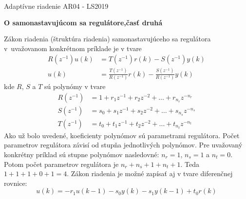 \documentclass[a4paper, 10pt, ]{article}
\def\oznacenieCasti{AR04 - LS2019}
\begin{document}
\fontsize{12pt}{22pt}\selectfont

\centerline{\textsf{Adaptívne riadenie} \hfill \textsf{\oznacenieCasti}}

\fontsize{18pt}{22pt}\selectfont





\begin{flushleft}
	\textbf{\textsf{O samonastavujúcom sa regulátore,\newline časť druhá}}
\end{flushleft}





\normalsize

\bigskip

\tableofcontents

\bigskip

\vspace{18pt}





Zákon riadenia (štruktúra riadenia) samonastavujúceho sa regulátora v~uvažovanom konkrétnom príklade je v tvare
\begin{subequations} \label{zakonRiadenia}
	\begin{align}
		R(z^{-1})u(k) & = T(z^{-1})r(k) - S(z^{-1})y(k) \\
		u(k) & = \frac{T(z^{-1})}{R(z^{-1})}r(k) - \frac{S(z^{-1})}{R(z^{-1})}y(k)
	\end{align}
\end{subequations}
kde $R$, $S$ a $T$ sú polynómy v tvare
\begin{subequations}
	\begin{align}
		R(z^{-1}) & = 1 + r_1z^{-1} + r_2z^{-2} + \ldots +  r_{n_r}z^{-n_r}\\
		S(z^{-1}) & = s_0 + s_1z^{-1} + s_2z^{-2} + \ldots +  s_{n_s}z^{-n_s} \\
		T(z^{-1}) & = t_0 + t_1z^{-1} + t_2z^{-2} + \ldots +  t_{n_t}z^{-n_t}
	\end{align}
\end{subequations}
Ako už bolo uvedené, koeficienty polynómov sú parametrami regulátora. Počet parametrov regulátora závisí od stupňa jednotlivých polynómov. Pre uvažovaný konkrétny príklad sú stupne polynómov nasledovné: $n_r = 1$, $n_s = 1$ a $n_t = 0$. Potom počet parametrov regulátora je $n_r + n_s + 1 + n_t + 1$. Teda $1 + 1 + 1 + 0 + 1 = 4$. Zákon riadenia je možné zapísať aj v tvare diferenčnej rovnice:
\begin{equation}
	u(k) =  - r_1 u(k-1) - s_0 y(k) - s_1 y(k-1) + t_0 r(k)
\end{equation}
\end{document}
